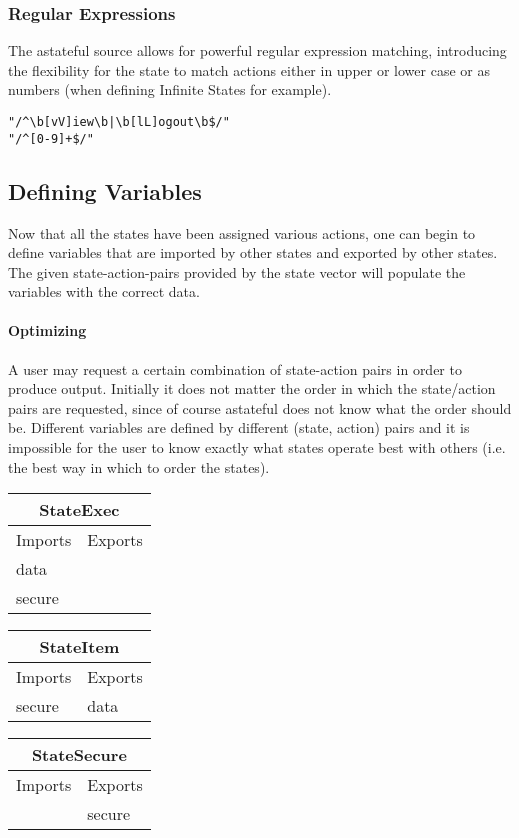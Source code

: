 \documentclass[11pt,twocolumn]{article}
\begin{document}
\subsubsection{Regular Expressions}
The astateful source allows for powerful regular expression matching, introducing the flexibility for the state to match actions either in upper or lower case or as numbers (when defining Infinite States for example).

\begin{verbatim}
"/^\b[vV]iew\b|\b[lL]ogout\b$/"
"/^[0-9]+$/"
\end{verbatim}

\subsection{Defining Variables}
Now that all the states have been assigned various actions, one can begin to define variables that are imported by other states and exported by other states. The given state-action-pairs provided by the state vector will populate the variables with the correct data.
\paragraph{Optimizing}
A user may request a certain combination of state-action pairs in order to produce output. Initially it does not matter the order in which the state/action pairs are requested, since of course astateful does not know what the order should be. Different variables are defined by different (state, action) pairs and it is impossible for the user to know exactly what states operate best with others (i.e. the best way in which to order the states).

\begin{center}
\begin{tabular}{|l|l|}
\hline
\multicolumn{2}{|c|}{StateExec} \\
\hline
Imports & Exports \\
\hline
data &  \\
secure &  \\
\hline
\end{tabular}
\begin{tabular}{|l|l|}
\hline
\multicolumn{2}{|c|}{StateItem} \\
\hline
Imports & Exports \\
\hline
secure &  data\\
\hline
\end{tabular}
\begin{tabular}{|l|l|}
\hline
\multicolumn{2}{|c|}{StateSecure} \\
\hline
Imports & Exports \\
\hline
 &  secure\\
\hline
\end{tabular}
\end{center}
\end{document}
